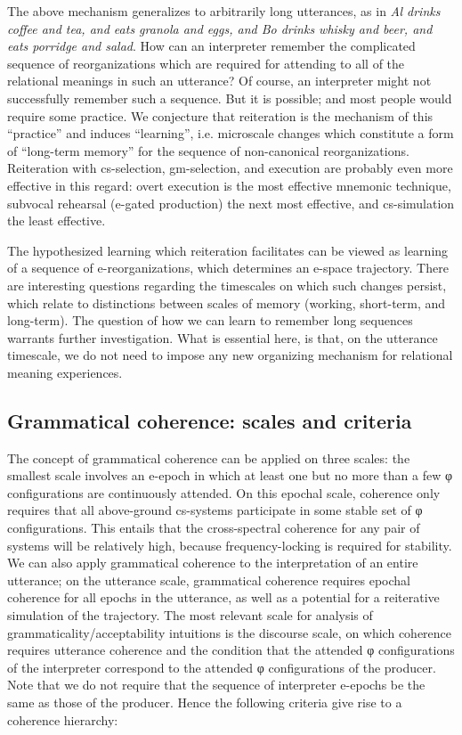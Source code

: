   The above mechanism generalizes to arbitrarily long utterances, as in \textit{Al drinks coffee and tea, and eats granola and eggs, and Bo drinks whisky and beer, and eats porridge and salad}. How can an interpreter remember the complicated sequence of reorganizations which are required for attending to all of the relational meanings in such an utterance? Of course, an interpreter might not successfully remember such a sequence. But it is possible; and most people would require some practice. We conjecture that reiteration is the mechanism of this “practice” and induces “learning”, i.e. microscale changes which constitute a form of “long-term memory” for the sequence of non-canonical reorganizations. Reiteration with cs-selection, gm-selection, and execution are probably even more effective in this regard: overt execution is the most effective mnemonic technique, subvocal rehearsal (e-gated production) the next most effective, and cs-simulation the least effective.

  The hypothesized learning which reiteration facilitates can be viewed as learning of a sequence of e-reorganizations, which determines an e-space trajectory. There are interesting questions regarding the timescales on which such changes persist, which relate to distinctions between scales of memory (working, short-term, and long-term). The question of how we can learn to remember long sequences warrants further investigation. What is essential here, is that, on the utterance timescale, we do not need to impose any new organizing mechanism for relational meaning experiences. 

\subsection{Grammatical coherence: scales and criteria}

The concept of grammatical coherence can be applied on three scales: the smallest scale involves an e-epoch in which at least one but no more than a few φ configurations are continuously attended. On this epochal scale, coherence only requires that all above-ground cs-systems participate in some stable set of φ configurations. This entails that the cross-spectral coherence for any pair of systems will be relatively high, because frequency-locking is required for stability. We can also apply grammatical coherence to the interpretation of an entire utterance; on the utterance scale, grammatical coherence requires epochal coherence for all epochs in the utterance, as well as a potential for a reiterative simulation of the trajectory. The most relevant scale for analysis of grammaticality/acceptability intuitions is the discourse scale, on which coherence requires utterance coherence and the condition that the attended φ configurations of the interpreter correspond to the attended φ configurations of the producer. Note that we do not require that the sequence of interpreter e-epochs be the same as those of the producer. Hence the following criteria give rise to a coherence hierarchy:

